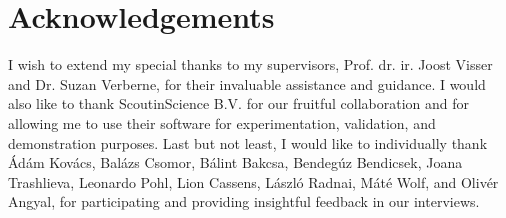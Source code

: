 \documentclass{report}
\begin{document}



\tableofcontents

\chapter*{Acknowledgements}
I wish to extend my special thanks to my supervisors, Prof. dr. ir. Joost Visser and Dr. Suzan Verberne, for their invaluable assistance and guidance. I would also like to thank ScoutinScience B.V. for our fruitful collaboration and for allowing me to use their software for experimentation, validation, and demonstration purposes. Last but not least, I would like to individually thank
Ádám Kovács,
Balázs Csomor,
Bálint Bakcsa,
Bendegúz Bendicsek,
Joana Trashlieva,
Leonardo Pohl,
Lion Cassens,
László Radnai,
Máté Wolf,
and Olivér Angyal,
for participating and providing insightful feedback in our interviews.













\end{document}
